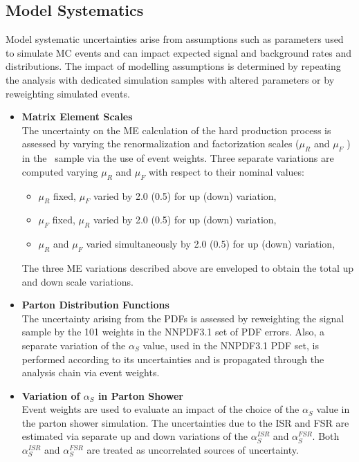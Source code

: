 \subsection{Model Systematics}
\label{Model_Systematics}
Model systematic uncertainties arise from assumptions such as parameters used to simulate MC events and can impact expected signal and background rates and distributions. 
The impact of modelling assumptions is determined by repeating the analysis with dedicated simulation samples with altered parameters or by reweighting simulated events.
\begin{itemize}
    \item {\bf Matrix Element Scales} \\
    The uncertainty on the ME calculation of the hard production process is assessed by varying the renormalization and factorization scales ($\mu_R$ and $\mu_F$ ) in the \Powheg\ sample via the use of event weights. 
    Three separate variations are computed varying $\mu_R$ and $\mu_F$ with respect to their nominal values:
    \begin{itemize}
        \item $\mu_R$ fixed, $\mu_F$ varied by 2.0 (0.5) for up (down) variation,
        \item $\mu_F$ fixed, $\mu_R$ varied by 2.0 (0.5) for up (down) variation,
        \item $\mu_R$ and $\mu_F$ varied simultaneously by 2.0 (0.5) for up (down) variation,
    \end{itemize} 
    The three ME variations described above are enveloped to obtain the total up and down scale variations.
    \item {\bf Parton Distribution Functions} \\
    The uncertainty arising from the PDFs is assessed by reweighting the \ttbar signal sample by the 101 weights in the NNPDF3.1 set of PDF errors. 
    Also, a separate variation of the $\alpha_S$ value, used in the NNPDF3.1 PDF set, is performed according to its uncertainties and is propagated through the analysis chain via event weights.
    \item {\bf Variation of $\alpha_S$ in Parton Shower} \\
    Event weights are used to evaluate an impact of the choice of the $\alpha_S$ value in the \Pythia parton shower simulation.
    The uncertainties due to the ISR and FSR are estimated via separate up and down variations of the $\alpha_S^{ISR}$ and $\alpha_S^{FSR}$. 
    Both $\alpha_S^{ISR}$ and $\alpha_S^{FSR}$ are treated as uncorrelated sources of uncertainty.

\end{itemize}
